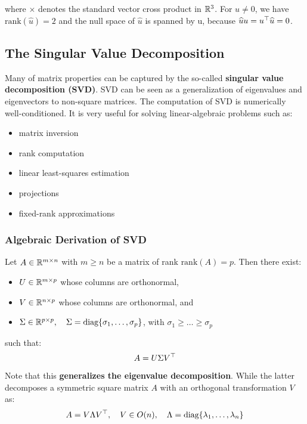 \noindent
where $\times$ denotes the standard vector cross product in $\mathbb{R}^3$.
For $u \ne 0$, we have $\text{rank}(\widehat{u}) = 2$ and the null space
of $\widehat{u}$ is spanned by u, because
$\widehat{u}u = u^{\top}\widehat{u} = 0$.


\subsection{The Singular Value Decomposition}
\label{sub:the_singular_value_decomposition}

Many of matrix properties can be captured by the so-called
\textbf{singular value decomposition (SVD)}.
SVD can be seen as a generalization of eigenvalues and
eigenvectors to non-square matrices.
The computation of SVD is numerically well-conditioned.
It is very useful for solving linear-algebraic problems such as:
\begin{itemize}
	\setlength\itemsep{-0.2em}
	\item matrix inversion
	\item rank computation
	\item linear least-squares estimation
	\item projections
	\item fixed-rank approximations
\end{itemize}


\subsubsection{Algebraic Derivation of SVD}
\label{ssub:algebraic_derivation_of_svd}

Let $A \in \mathbb{R}^{m \times{} n}$ with $m \ge n$ be a matrix of rank
$\text{rank}(A) = p$. Then there exist:
\begin{itemize}
	\item $U \in \mathbb{R}^{m \times{} p}$ whose columns are orthonormal,
	\item $V \in \mathbb{R}^{n \times{} p}$ whose columns are orthonormal, and
	\item $\Sigma \in \mathbb{R}^{p \times{} p}, \quad
		\Sigma = \text{diag}\{ \sigma_1, \ldots, \sigma_p \}$, with
		$\sigma_1 \ge \ldots \ge \sigma_p$
\end{itemize}
\noindent
such that:
	\[A = U \Sigma V^{\top}\]

\noindent
Note that this \textbf{generalizes the eigenvalue decomposition}.
While the latter decomposes a symmetric square matrix $A$ with
an orthogonal transformation $V$ as:
\[A = V \Lambda V^{\top}, \quad V \in O(n), \quad
\Lambda = \text{diag}\{\lambda_1, \ldots, \lambda_n\}\]

